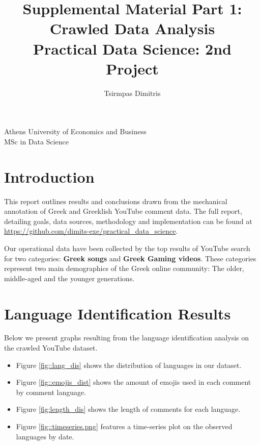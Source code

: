 \documentclass[11pt, a4paper]{article}
\title{\Huge Supplemental Material Part 1: Crawled Data Analysis\\
	\LARGE Practical Data Science: 2nd Project}
\author{\Large  Tsirmpas Dimitris }
\begin{document}
	
	\maketitle
	\begin{center}
		\large Athens University of Economics and Business \\
		\large MSc in Data Science
		
	\end{center}
	
	
	\section{Introduction}
	This report outlines results and conclusions drawn from the mechanical annotation of Greek and Greeklish YouTube comment data. The full report, detailing goals, data sources, methodology and implementation can be found at \url{https://github.com/dimits-exe/practical_data_science}.
	
	Our operational data have been collected by the top results of YouTube search for two categories: \textbf{Greek songs} and \textbf{Greek Gaming videos}. These categories represent two main demographics of the Greek online community: The older, middle-aged and the younger generations.
	
	
	\section{Language Identification Results}
	
	Below we present graphs resulting from the language identification analysis on the crawled YouTube dataset.
	
	\begin{itemize}
		\item Figure \ref{fig::lang_dis} shows the distribution of languages in our dataset.
		
		\item Figure \ref{fig::emojis_dist} shows the amount of emojis used in each comment by comment language.
		
		\item Figure \ref{fig:length_dis} shows the length of comments for each language.
		
		\item Figure \ref{fig::timeseries.png} features a time-series plot on the observed languages by date.
	\end{itemize}
	
\end{document}
